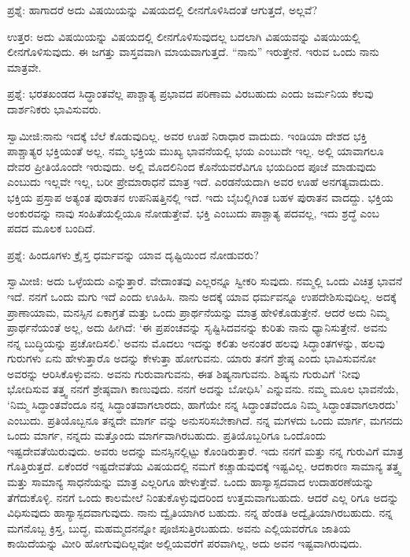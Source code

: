 ಪ್ರಶ್ನೆ: ಹಾಗಾದರೆ ಅದು ವಿಷಯಿಯನ್ನು ವಿಷಯದಲ್ಲಿ ಲೀನಗೊಳಿಸಿದಂತೆ ಆಗುತ್ತದೆ, ಅಲ್ಲವೆ?

ಉತ್ತರ: ಅದು ವಿಷಯಿಯನ್ನು ವಿಷಯದಲ್ಲಿ ಲೀನಗೊಳಿಸುವುದಲ್ಲ ಬದಲಾಗಿ ವಿಷಯವನ್ನು ವಿಷಯಿಯಲ್ಲಿ ಲೀನಗೊಳಿಸುವುದು. ಈ ಜಗತ್ತು ವಾಸ್ತವವಾಗಿ ಮಾಯವಾಗುತ್ತದೆ. “ನಾನು” ಇರುತ್ತೇನೆ. ಇರುವ ಒಂದು ನಾನು ಮಾತ್ರವೇ.

ಪ್ರಶ್ನೆ: ಭರತಖಂಡದ ಸಿದ್ಧಾಂತವೆಲ್ಲ ಪಾಶ್ಚಾತ್ಯ ಪ್ರಭಾವದ ಪರಿಣಾಮ ವಿರಬಹುದು ಎಂದು ಜರ್ಮನಿಯ ಕೆಲವು ದಾರ್ಶನಿಕರು ಭಾವಿಸುವರು.

ಸ್ವಾಮೀಜಿ:ನಾನು ಇದಕ್ಕೆ ಬೆಲೆ ಕೊಡುವುದಿಲ್ಲ. ಅವರ ಊಹೆ ನಿರಾಧಾರ ವಾದುದು. ಇಂಡಿಯಾ ದೇಶದ ಭಕ್ತಿ ಪಾಶ್ಚಾತ್ಯರ ಭಕ್ತಿಯಂತೆ ಅಲ್ಲ. ನಮ್ಮ ಭಕ್ತಿಯ ಮುಖ್ಯ ಭಾವನೆಯಲ್ಲಿ ಭಯ ಎಂಬುದೇ ಇಲ್ಲ. ಅಲ್ಲಿ ಯಾವಾಗಲೂ ದೇವರ ಪ್ರೀತಿಯೊಂದೇ ಇರುವುದು. ಅಲ್ಲಿ ಮೊದಲಿನಿಂದ ಕೊನೆಯವರೆವಿಗೂ ಭಯದಿಂದ ಪೂಜೆ ಮಾಡುವುದು ಎಂಬುದು ಇಲ್ಲವೇ ಇಲ್ಲ, ಬರೀ ಪ್ರೇಮಾರಾಧನೆ ಮಾತ್ರ ಇದೆ. ಎರಡನೆಯದಾಗಿ ಅವರ ಊಹೆ ಅನಗತ್ಯವಾದುದು. ಭಕ್ತಿಯ ಪ್ರಸ್ತಾಪ ಅತ್ಯಂತ ಪುರಾತನ ಉಪನಿಷತ್ತಿನಲ್ಲಿ ಇದೆ. ಇದು ಬೈಬಲ್ಲಿಗಿಂತ ಬಹಳ ಪುರಾತನ ವಾದದ್ದು. ಭಕ್ತಿಯ ಅಂಕುರವನ್ನು ನಾವು ಸಂಹಿತೆಯಲ್ಲಿಯೂ ನೋಡುತ್ತೇವೆ. ಭಕ್ತಿ ಎಂಬುದು ಪಾಶ್ಚಾತ್ಯ ಪದವಲ್ಲ, ಇದು ಶ್ರದ್ಧೆ ಎಂಬ ಪದದ ಮೂಲಕ ಬಂದಿದೆ.

ಪ್ರಶ್ನೆ: ಹಿಂದೂಗಳು ಕ್ರೈಸ್ತ ಧರ್ಮವನ್ನು ಯಾವ ದೃಷ್ಟಿಯಿಂದ ನೋಡುವರು?

ಸ್ವಾಮೀಜಿ: ಅದು ಒಳ್ಳೆಯದು ಎನ್ನುತ್ತಾರೆ. ವೇದಾಂತವು ಎಲ್ಲರನ್ನೂ ಸ್ವೀಕರಿ ಸುವುದು. ನಮ್ಮಲ್ಲಿ ಒಂದು ವಿಚಿತ್ರ ಭಾವನೆ ಇದೆ. ನನಗೆ ಒಂದು ಮಗು ಇದೆ ಎಂದು ಊಹಿಸಿ. ನಾನು ಅದಕ್ಕೆ ಯಾವ ಧರ್ಮವನ್ನೂ ಉಪದೇಶಿಸುವುದಿಲ್ಲ. ಅದಕ್ಕೆ ಪ್ರಾಣಾಯಾಮ, ಮನಸ್ಸಿನ ಏಕಾಗ್ರತೆ ಮತ್ತು ಒಂದು ಪ್ರಾರ್ಥನೆಯನ್ನು ಮಾತ್ರ ಹೇಳಿಕೊಡುತ್ತೇನೆ. ಆದರೆ ಅದು ನಿಮ್ಮ ಪ್ರಾರ್ಥನೆಯಂತೆ ಅಲ್ಲ, ಅದು ಹೀಗಿದೆ: ‘ಈ ಪ್ರಪಂಚವನ್ನು ಸೃಷ್ಟಿಸಿದವನನ್ನು ಕುರಿತು ನಾನು ಧ್ಯಾನಿಸುತ್ತೇನೆ. ಅವನು ನನ್ನ ಬುದ್ಧಿಯನ್ನು ಪ್ರಚೋದಿಸಲಿ.’ ಅವನು ಮೊದಲು ಇದನ್ನು ಕಲಿತು ಅನಂತರ ಹಲವು ಸಿದ್ಧಾಂತಗಳನ್ನು, ಹಲವು ಗುರುಗಳು ಏನು ಹೇಳುತ್ತಾರೊ ಅದನ್ನು ಕೇಳುತ್ತಾ ಹೋಗುವನು. ಯಾರು ತನಗೆ ಶ್ರೇಷ್ಠ ಎಂದು ಭಾವಿಸುವನೋ ಅವರನ್ನು ಆರಿಸಿಕೊಳ್ಳುವನು. ಅವನು ಗುರುವಾಗುವನು, ಈತ ಶಿಷ್ಯನಾಗುವನು. ಶಿಷ್ಯನು ಗುರುವಿಗೆ ‘ನೀವು ಭೋದಿಸುವ ತತ್ತ್ವ ನನಗೆ ಶ್ರೇಷ್ಠವಾಗಿ ಕಾಣುವುದು. ನನಗೆ ಅದನ್ನು ಬೋಧಿಸಿ’ ಎನ್ನುವನು. ನಮ್ಮ ಮೂಲ ಭಾವನೆಯೆ, ‘ನಿಮ್ಮ ಸಿದ್ಧಾಂತವೆಂದೂ ನನ್ನ ಸಿದ್ಧಾಂತವಾಗಲಾರದು, ಹಾಗೆಯೇ ನನ್ನ ಸಿದ್ಧಾಂತವೆಂದೂ ನಿಮ್ಮ ಸಿದ್ಧಾಂತವಾಗಲಾರದು’ ಎಂಬುದು. ಪ್ರತಿಯೊಬ್ಬನೂ ತನ್ನದೇ ಮಾರ್ಗ ವನ್ನು ಅನುಸರಿಸಬೇಕಾಗಿದೆ. ನನ್ನ ಮಗಳದು ಒಂದು ಮಾರ್ಗ, ಮಗನದು ಒಂದು ಮಾರ್ಗ, ನನ್ನದು ಮತ್ತೊಂದು ಮಾರ್ಗವಾಗಿರಬಹುದು. ಪ್ರತಿಯೊಬ್ಬರಿಗೂ ಒಂದೊಂದು ಇಷ್ಟದೇವತೆಯಿರುವುದು. ಅವರು ಅದನ್ನು ಮನಸ್ಸಿನಲ್ಲಿಟ್ಟು ಕೊಂಡಿರುತ್ತಾರೆ. ಇದು ನನಗೆ ಮತ್ತು ನನ್ನ ಗುರುವಿಗೆ ಮಾತ್ರ ಗೊತ್ತಿರುತ್ತದೆ. ಏಕೆಂದರೆ ಇಷ್ಟದೇವತೆಯ ವಿಷಯದಲ್ಲಿ ನಮಗೆ ಕಚ್ಚಾಡುವುದಕ್ಕೆ ಇಷ್ಟವಿಲ್ಲ. ಆದಕಾರಣ ಸಾಮಾನ್ಯ ತತ್ತ್ವ ಮತ್ತು ಸಾಮಾನ್ಯ ಸಾಧನೆಯನ್ನು ಮಾತ್ರ ಎಲ್ಲರಿಗೂ ಹೇಳುತ್ತೇವೆ. ಒಂದು ಹಾಸ್ಯಾಸ್ಪದವಾದ ಉದಾಹರಣೆಯನ್ನು ತೆಗೆದುಕೊಳ್ಳಿ. ನನಗೆ ಒಂದು ಕಾಲಮೇಲೆ ನಿಂತುಕೊಳ್ಳುವುದರಿಂದ ಉತ್ತಮವಾಗಬಹುದು. ಆದರೆ ಎಲ್ಲ ರಿಗೂ ಅದನ್ನು ವಿಧಿಸುವುದು ಹಾಸ್ಯಾಸ್ಪದವಾಗುವುದು. ನಾನು ದ್ವೈತಿಯಾಗಿರ ಬಹುದು. ನನ್ನ ಹೆಂಡತಿ ಅದ್ವೈತಿಯಾಗಿರಬಹುದು. ನನ್ನ ಮಗನೊಬ್ಬ ಕ್ರಿಸ್ತ, ಬುದ್ಧ, ಮಹಮ್ಮದನನ್ನೋ ಪೂಜಿಸುತ್ತಿರಬಹುದು. ಅವನು ಎಲ್ಲಿಯವರೆಗೂ ಜಾತಿಯ ಕಾಯಿದೆಯನ್ನು ಮೀರಿ ಹೋಗುವುದಿಲ್ಲವೋ ಅಲ್ಲಿಯವರೆಗೆ ಪರವಾಗಿಲ್ಲ, ಅದು ಅವನ ಇಷ್ಟವಾಗಿರುವುದು.

